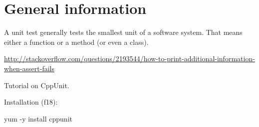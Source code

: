 

\renewcommand\TITLE{Unit testing}


\topmatter

\section{General information}

A unit test generally tests the smallest unit of a software system.
That means either a function or a method (or even a class).

\newpage
{}

\url{http://stackoverflow.com/questions/2193544/how-to-print-additional-information-when-assert-fails}

\newpage
Tutorial on CppUnit.
		
Installation (f18):
\begin{console}
yum -y install cppunit
\end{console}

\newpage{}

